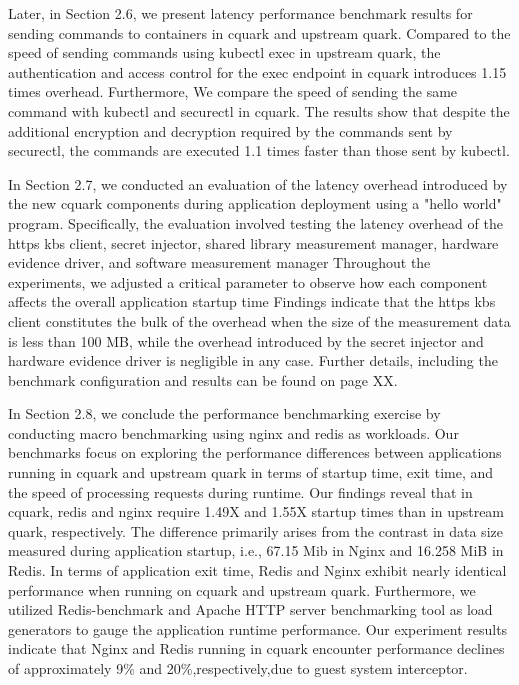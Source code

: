 Later, in Section 2.6, we present latency performance benchmark results for sending commands to containers in cquark and upstream quark. Compared to the speed of sending commands using kubectl exec in upstream quark, the authentication and access control for the exec endpoint in cquark introduces 1.15 times overhead. Furthermore, We compare the speed of sending the same command with kubectl and securectl in cquark. The results show that despite the additional encryption and decryption required by the commands sent by securectl, the commands are executed 1.1 times faster than those sent by kubectl.


In Section 2.7, we conducted an evaluation of the latency overhead introduced by the new cquark components during application deployment using a "hello world" program.  Specifically, the evaluation involved testing the latency overhead of the https kbs client, secret injector, shared library measurement manager, hardware evidence driver, and software measurement manager Throughout the experiments, we adjusted a critical parameter to observe how each component affects the overall application startup time Findings indicate that the https kbs client constitutes the bulk of the overhead when the size of the measurement data is less than 100 MB, while the overhead introduced by the secret injector and hardware evidence driver is negligible in any case. Further details, including the benchmark configuration and results can be found on page XX.


In Section 2.8, we conclude the performance benchmarking exercise by conducting macro benchmarking using nginx and redis as workloads. Our benchmarks focus on exploring the performance differences between applications running in cquark and upstream quark in terms of startup time, exit time, and the speed of processing requests during runtime. Our findings reveal that in cquark, redis and nginx require 1.49X and 1.55X startup times than in upstream quark, respectively. The difference primarily arises from the contrast in data size measured during application startup, i.e., 67.15 Mib in Nginx and 16.258 MiB in Redis. In terms of application exit time, Redis and Nginx exhibit nearly identical performance when running on cquark and upstream quark. Furthermore, we utilized Redis-benchmark and Apache HTTP server benchmarking tool as load generators to gauge the application runtime performance. Our experiment results indicate that Nginx and Redis running in cquark encounter performance declines of approximately 9\% and 20\%,respectively,due to guest system interceptor.

